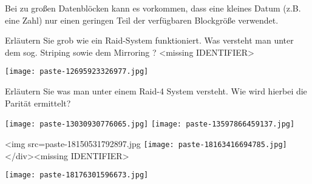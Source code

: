 \documentclass{article}
\begin{document}
\begin{tcolorbox}[colback=white!10!white,colframe=lightgray!75!black,
  savelowerto=\jobname_ex.tex]

\begin{center}
Bei zu großen Datenblöcken kann es vorkommen, dass eine kleines Datum (z.B. eine Zahl) nur einen geringen Teil der verfügbaren Blockgröße verwendet.

\end{center}

\tcblower

\justifying

\end{tcolorbox}
\begin{tcolorbox}[colback=white!10!white,colframe=lightgray!75!black,
  savelowerto=\jobname_ex.tex]

\begin{center}
 Erläutern Sie grob wie ein Raid-System funktioniert. Was versteht man unter dem sog. 
Striping
sowie dem 
Mirroring
? <missing IDENTIFIER>

\end{center}

\tcblower

\justifying
\texttt{[image: paste-12695923326977.jpg]}

\end{tcolorbox}
\begin{tcolorbox}[colback=white!10!white,colframe=lightgray!75!black,
  savelowerto=\jobname_ex.tex]

\begin{center}
 Erläutern Sie was man unter einem 
Raid-4 System
versteht. Wie wird hierbei die Parität ermittelt? 

\end{center}

\tcblower

\justifying
\texttt{[image: paste-13030930776065.jpg]}
\texttt{[image: paste-13597866459137.jpg]}

\end{tcolorbox}
\begin{tcolorbox}[colback=white!10!white,colframe=lightgray!75!black,
  savelowerto=\jobname_ex.tex]

\begin{center}
 <img src=paste-18150531792897.jpg 
\texttt{[image: paste-18163416694785.jpg]}
 </div><missing IDENTIFIER>

\end{center}

\tcblower

\justifying
\texttt{[image: paste-18176301596673.jpg]}

\end{tcolorbox}
\end{document}
